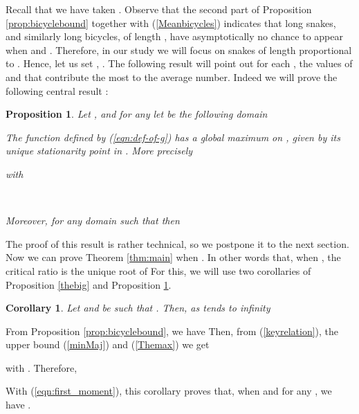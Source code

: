 \documentclass[aop,noinfoline]{imsart}
\newtheorem{proposition}[theorem]{Proposition}
\newtheorem{corollary}[theorem]{Corollary}
\renewcommand{\Box}{{\vrule width0.6ex height1em depth0cm}}
\newenvironment{proof}{\noindent{\bf Proof:}}{\hfill \Box}
\begin{document}
  Recall that we have taken . Observe
  that the second part of Proposition \ref{prop:bicyclebound} together with
  (\ref{Meanbicycles}) indicates that  long  snakes, and similarly
  long bicycles, of length , have asymptotically no chance
  to appear when  and .  Therefore, in our study we will  focus  on snakes  of length proportional to .    Hence, let us
set , . The following result will point out for each , the values of  and  that contribute the most to the average number. Indeed we  will prove the following central result :
\begin{proposition}\label{prop:function g}
 Let  , and  for any  let  be the following domain   
 
 The function  
 defined by (\ref{eqn:def-of-g})  has a  global maximum on , given by its unique stationarity point in . More precisely 

with

     \ 


Moreover, for any domain  such that  then 


\end{proposition}
The proof of this result is rather technical, so we postpone it to the next section.\\

Now we can prove  Theorem \ref{thm:main} when . In other words that,  when  
, the critical ratio  is  the unique root of   For this,  we will use  two  corollaries of Proposition \ref{thebig} and Proposition \ref{prop:function g}.
\begin{corollary}\label{lowerbound}
Let  and  be such that .  Then, as  tends to infinity 
 
\end{corollary}
\begin{proof} From Proposition \ref {prop:bicyclebound}, we have  Then, from (\ref {keyrelation}), the upper bound (\ref {minMaj}) and (\ref{Themax}) we get 
 
 with . Therefore,
  
\end{proof}\medskip

With (\ref{eqn:first_moment}), this corollary  proves that,  when  and   for any , we have  . \smallskip
\end{document}
